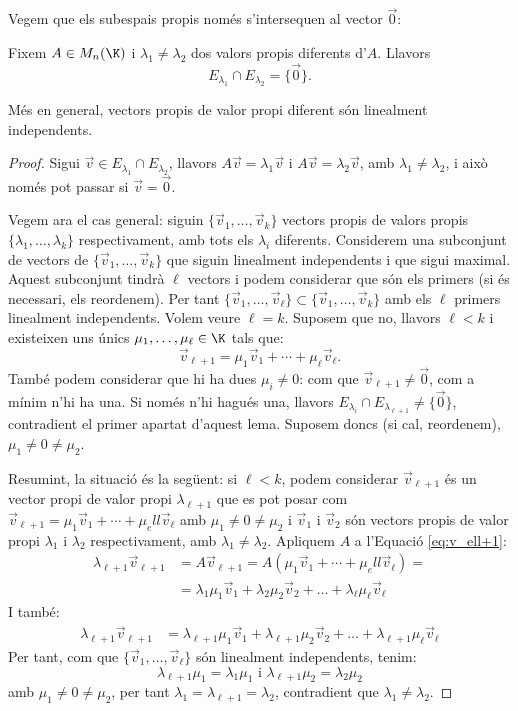 Vegem que els subespais propis només s'intersequen al vector $\vec 0$:
\begin{lema}\label{lema:veps_vap_dif_LI}
Fixem $A\in M_n(\K)$ i $\lambda_1\neq\lambda_2$ dos valors propis diferents d'$A$. Llavors
$$ E_{\lambda_1}\cap E_{\lambda_2}=\{\vec 0\}. $$

Més en general, vectors propis de valor propi diferent són linealment independents.
\end{lema}
\begin{proof}
Sigui $\vec v\in E_{\lambda_1}\cap E_{\lambda_2}$, llavors $A\vec v=\lambda_1\vec v$ i $A\vec v=\lambda_2\vec v$, amb $\lambda_1\neq\lambda_2$, i això només pot passar si $\vec v=\vec 0$.

Vegem ara el cas general: siguin $\{\vec v_1, \dots, \vec v_k\}$ vectors propis de valors propis $\{\lambda_1, \dots, \lambda_k\}$ respectivament, amb tots els $\lambda_i$ diferents. Considerem una subconjunt de vectors de $\{\vec v_1, \dots, \vec v_k\}$ que siguin linealment independents i que sigui maximal. Aquest subconjunt tindrà $\ell$ vectors i podem considerar que són els primers (si és necessari, els reordenem). Per tant  $\{\vec v_1, \dots, \vec v_\ell\}\subset\{\vec v_1, \dots, \vec v_k\}$ amb els $\ell$ primers linealment independents. Volem veure $\ell=k$. Suposem que no, llavors $\ell<k$ i existeixen uns únics $\mu_1,\dots, \mu_\ell \in \K$ tals que:
\begin{equation}\label{eq:v_ell+1}
\vec v_{\ell+1}=\mu_1\vec v_1+ \cdots+ \mu_\ell\vec v_\ell.
\end{equation}
També podem considerar que hi ha dues $\mu_i\neq0$: com que  $\vec v_{\ell+1}\neq\vec 0$, com a mínim n'hi ha una. Si només n'hi hagués una, llavors $E_{\lambda_i}\cap E_{\lambda_{\ell+1}}\neq\{\vec 0\}$, contradient el primer apartat d'aquest lema. Suposem doncs (si cal, reordenem), $\mu_1\neq0\neq\mu_2$.

Resumint, la situació és la següent: si $\ell<k$, podem considerar $\vec v_{\ell+1}$ és un vector propi de valor propi $\lambda_{\ell+1}$ que es pot posar com $\vec v_{\ell+1}=\mu_1\vec v_1+ \cdots+ \mu_ell\vec v_\ell$ amb $\mu_1\neq0\neq\mu_2$ i $\vec v_1$ i $\vec v_2$ són vectors propis de valor propi $\lambda_1$ i $\lambda_2$ respectivament, amb $\lambda_1\neq\lambda_2$. Apliquem $A$ a l'Equació \eqref{eq:v_ell+1}:
\begin{align*}
\lambda_{\ell+1}\vec v_{\ell+1} & =A\vec v_{\ell+1}=A(\mu_1\vec v_1+ \cdots+ \mu_ell\vec v_\ell)= \\ & = \lambda_1\mu_1\vec v_1+\lambda_2\mu_2\vec v_2+\dots+\lambda_\ell\mu_\ell\vec v_\ell
\end{align*}
I també:
\begin{align*}
\lambda_{\ell+1}\vec v_{\ell+1} & = \lambda_{\ell+1}\mu_1\vec v_1+\lambda_{\ell+1}\mu_2\vec v_2+\dots+\lambda_{\ell+1}\mu_\ell\vec v_\ell
\end{align*}
Per tant, com que $\{\vec v_1, \dots, \vec v_\ell\}$ són linealment independents, tenim:
$$
\lambda_{\ell+1} \mu_1=\lambda_1\mu_1 \text{ i } \lambda_{\ell+1}\mu_2=\lambda_2\mu_2
$$
amb $\mu_1\neq0\neq\mu_2$, per tant $\lambda_1=\lambda_{\ell+1}=\lambda_2$, contradient que $\lambda_1\neq\lambda_2$.


\end{proof}
